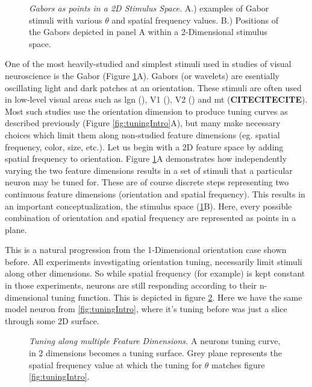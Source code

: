 \begin{figure}[ht]
	\caption{\textit{Gabors as points in a 2D Stimulus Space.} A.) examples of Gabor stimuli with various $\theta$ and spatial frequency values. B.) Positions of the Gabors depicted in panel A within a 2-Dimensional stimulus space. }
	\label{fig:gabor}
\end{figure}

One of the most heavily-studied and simplest stimuli used in studies of visual neuroscience is the Gabor (Figure \ref{fig:gabor}A). Gabors (or wavelets) are esentially oscillating light and dark patches at an orientation. These stimuli are often used in low-level visual areas such as \gls{lgn} (\cite{Mahon2001}), V1 (\cite{Bredfeldt2002,Lennie1990, Tanigawa2010}), V2 (\cite{Liu2020}) and \gls{mt} (\textbf{CITECITECITE}). Most such studies use the orientation dimension to produce tuning curves as described previously (Figure \ref{fig:tuningIntro}A), but many make necessary choices which limit them along non-studied feature dimensions (eg. spatial frequency, color, size, etc.). Let us begin with a 2D feature space by adding spatial frequency to orientation. Figure \ref{fig:gabor}A demonstrates how independently varying the two feature dimensions results in a set of stimuli that a particular neuron may be tuned for. These are of course discrete steps representing two continuous feature dimensions (orientation and spatial frequency). This results in an important conceptualization, the stimulus space (\ref{fig:gabor}B). Here, every possible combination of orientation and spatial frequency are represented as points in a plane. 



This is a natural progression from the 1-Dimensional orientation case shown before. All experiments investigating orientation tuning, necessarily limit stimuli along other dimensions. So while spatial frequency (for example) is kept constant in those experiments, neurons are still responding according to their n-dimensional tuning function. This is depicted in figure \ref{fig:2Dtuning}. Here we have the same model neuron from \ref{fig:tuningIntro}, where it's tuning before was just a slice through some 2D surface.

\begin{figure}[h]
		\caption{\textit{Tuning along multiple Feature Dimensions.} A neurons tuning curve, in 2 dimensions becomes a tuning surface. Grey plane represents the spatial frequency value at which the tuning for $\theta$ matches figure \ref{fig:tuningIntro}.}
		\label{fig:2Dtuning}
\end{figure}

